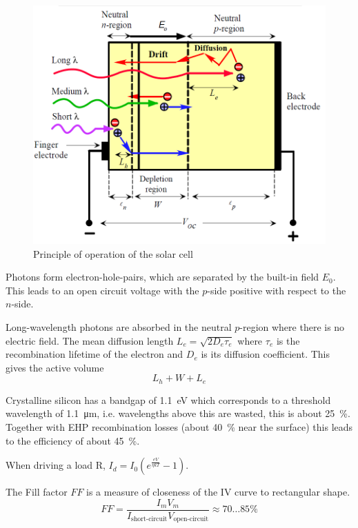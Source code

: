 \begin{figure}[ht!]
    \centering
    \includegraphics[width=0.5\linewidth]{images/solar_cell.png}
    \caption{Principle of operation of the solar cell}
\end{figure}

Photons form electron-hole-pairs, which are separated by the built-in field $E_0$.
This leads to an open circuit voltage with the $p$-side positive with respect to
the $n$-side.

Long-wavelength photons are absorbed in the neutral $p$-region where there is no
electric field. 
The mean diffusion length $L_e=\sqrt{2D_e\tau_e}$ where $\tau_e$ is the
recombination lifetime of the electron and $D_e$ is its diffusion coefficient.
This gives the active volume
\begin{equation}
    L_h + W + L_e
\end{equation}

Crystalline silicon has a bandgap of \SI{1.1}{\electronvolt} which corresponds
to a threshold wavelength of \SI{1.1}{\micro\meter}, i.e. wavelengths above this
are wasted, this is about \SI{25}{\percent}. 
Together with EHP recombination losses (about \SI{40}{\percent} near the surface)
this leads to the efficiency of about \SI{45}{\percent}.

When driving a load R, $I_d = I_0 \left( e^{\frac{eV}{\eta k T}}-1 \right)$.

The Fill factor $FF$ is a measure of closeness of the IV curve to rectangular shape.
\begin{equation}
    FF = \frac{I_m V_m}{I_{\text{short-circuit}} V_{\text{open-circuit}}} \approx 70 \ldots 85 \%
\end{equation}
